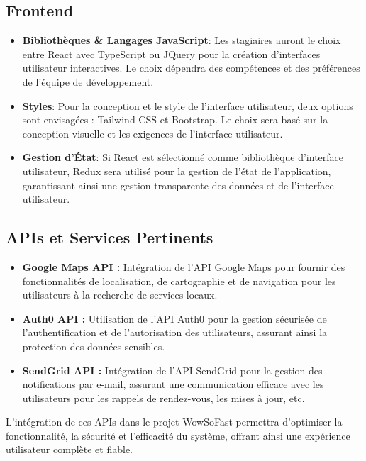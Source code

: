 \subsection{Frontend}
\begin{itemize}
    \item \textbf{Bibliothèques \& Langages JavaScript}: Les stagiaires auront le choix entre React avec TypeScript ou JQuery pour la création d'interfaces utilisateur interactives. Le choix dépendra des compétences et des préférences de l'équipe de développement.
    \item \textbf{Styles}: Pour la conception et le style de l'interface utilisateur, deux options sont envisagées : Tailwind CSS et Bootstrap. Le choix sera basé sur la conception visuelle et les exigences de l'interface utilisateur.
    \item \textbf{Gestion d'État}: Si React est sélectionné comme bibliothèque d'interface utilisateur, Redux sera utilisé pour la gestion de l'état de l'application, garantissant ainsi une gestion transparente des données et de l'interface utilisateur.
\end{itemize}

\subsection{APIs et Services Pertinents }

\begin{itemize}
    \item \textbf{Google Maps API :} Intégration de l'API Google Maps pour fournir des fonctionnalités de localisation, de cartographie et de navigation pour les utilisateurs à la recherche de services locaux.
    
    \item \textbf{Auth0 API :} Utilisation de l'API Auth0 pour la gestion sécurisée de l'authentification et de l'autorisation des utilisateurs, assurant ainsi la protection des données sensibles.
    
    \item \textbf{SendGrid API :} Intégration de l'API SendGrid pour la gestion des notifications par e-mail, assurant une communication efficace avec les utilisateurs pour les rappels de rendez-vous, les mises à jour, etc.
\end{itemize}

\vspace{0.5cm}

L'intégration de ces APIs dans le projet WowSoFast permettra d'optimiser la fonctionnalité, la sécurité et l'efficacité du système, offrant ainsi une expérience utilisateur complète et fiable.

